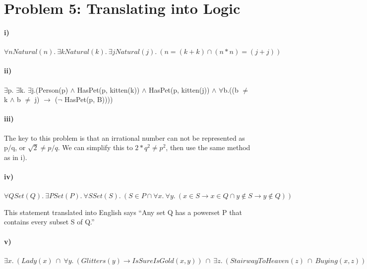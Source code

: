 \documentclass[10pt,letter]{article}
\begin{document}
\section*{Problem 5: Translating into Logic}

\paragraph{i)} $\forall n Natural(n) .\ \exists k Natural(k) .\ \exists j Natural(j) .\ (n = (k + k) \cap (n * n) = (j + j))$

\paragraph{ii)} $ \exists$p. $\exists$k.  $\exists$j.(Person(p) $\wedge$ HasPet(p, kitten(k)) $\wedge$ HasPet(p,  kitten(j)) $\wedge$ $\forall$b.((b $\neq$ k  $\wedge$ b $\neq$   j) $\rightarrow$ ($\neg$ HasPet(p, B))))

\paragraph{iii)} The key to this problem is that an irrational number can not be represented as p/q, or $\sqrt{2} \not = p/q$. We can simplify this to $2 * q^2 \not = p^2$, then use the same method as in i).

\paragraph{iv)}
$\forall Q Set(Q) .\ \exists P Set(P) .\ \forall S Set(S) .\ (S \in P \cap \forall x .\ \forall y .\ (x \in S \rightarrow x \in Q \cap y \not \in S \rightarrow y \not \in Q))$

This statement translated into English says ``Any set Q has a powerset P that contains every subset S of Q.''
\paragraph{v)}
$\exists x .\ (Lady(x)\ \cap\ \forall y .\ (Glitters(y) \rightarrow IsSureIsGold(x, y))\ \cap\ \exists z .\ (StairwayToHeaven(z)\ \cap\ Buying(x, z)))$
\end{document}
